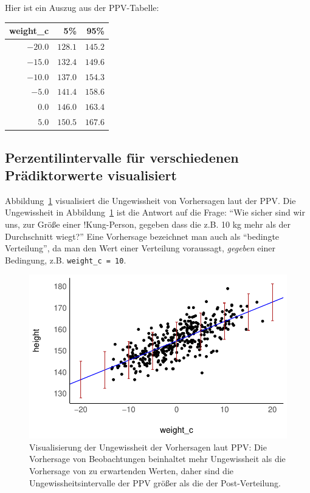 \documentclass[
  a4paper,
  DIV=11]{scrreprt}
\theoremstyle{definition}
\theoremstyle{remark}
\begin{document}
Hier ist ein Auszug aus der PPV-Tabelle:

\begin{longtable}{rrr}
\toprule
weight\_c & 5\% & 95\% \\ 
\midrule
$-20.0$ & $128.1$ & $145.2$ \\ 
$-15.0$ & $132.4$ & $149.6$ \\ 
$-10.0$ & $137.0$ & $154.3$ \\ 
$-5.0$ & $141.4$ & $158.6$ \\ 
$0.0$ & $146.0$ & $163.4$ \\ 
$5.0$ & $150.5$ & $167.6$ \\ 
\bottomrule
\end{longtable}

\hypertarget{perzentilintervalle-fuxfcr-verschiedenen-pruxe4diktorwerte-visualisiert}{%
\subsection{Perzentilintervalle für verschiedenen Prädiktorwerte
visualisiert}\label{perzentilintervalle-fuxfcr-verschiedenen-pruxe4diktorwerte-visualisiert}}

Abbildung~\ref{fig-m43a-nochmal} visualisiert die Ungewissheit von
Vorhersagen laut der PPV. Die Ungewissheit in
Abbildung~\ref{fig-m43a-nochmal} ist die Antwort auf die Frage: ``Wie
sicher sind wir uns, zur Größe einer !Kung-Person, gegeben dass die z.B.
10 kg mehr als der Durchschnitt wiegt?'' Eine Vorhersage bezeichnet man
auch als ``bedingte Verteilung'', da man den Wert einer Verteilung
voraussagt, \emph{gegeben} einer Bedingung, z.B.
\texttt{weight\_c\ =\ 10}.

\begin{figure}

{\centering \includegraphics{./lineare-modelle_files/figure-pdf/fig-m43a-nochmal-1.pdf}

}

\caption{\label{fig-m43a-nochmal}Visualisierung der Ungewissheit der
Vorhersagen laut PPV: Die Vorhersage von Beobachtungen beinhaltet mehr
Ungewissheit als die Vorhersage von zu erwartenden Werten, daher sind
die Ungewissheitsintervalle der PPV größer als die der Post-Verteilung.}

\end{figure}
\end{document}
